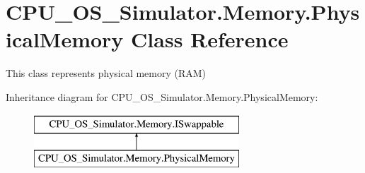 \hypertarget{class_c_p_u___o_s___simulator_1_1_memory_1_1_physical_memory}{}\section{C\+P\+U\+\_\+\+O\+S\+\_\+\+Simulator.\+Memory.\+Physical\+Memory Class Reference}
\label{class_c_p_u___o_s___simulator_1_1_memory_1_1_physical_memory}


This class represents physical memory (R\+A\+M)  


Inheritance diagram for C\+P\+U\+\_\+\+O\+S\+\_\+\+Simulator.\+Memory.\+Physical\+Memory\+:\begin{figure}[H]
\begin{center}
\leavevmode
\includegraphics[height=2.000000cm]{class_c_p_u___o_s___simulator_1_1_memory_1_1_physical_memory}
\end{center}
\end{figure}
